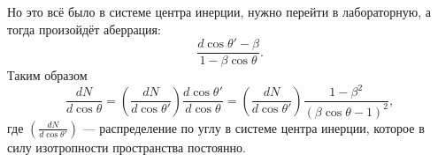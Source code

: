 Но это всё было в системе центра инерции, нужно перейти в лабораторную, а тогда произойдёт аберрация:
\begin{equation*}
	\frac{d \cos \theta' - \beta}{1 - \beta \cos \theta}.
\end{equation*}
Таким образом
\begin{equation*}
	\frac{d N}{d \cos \theta} = \left(\frac{d N}{d \cos \theta'}\right) \frac{d \cos \theta'}{d \cos \theta} 
	=
	\left(\frac{d N}{d \cos \theta'}\right) \frac{1 - \beta^2}{(\beta \cos \theta - 1)^2},
\end{equation*}
где $\left(\frac{d N}{d \cos \theta'}\right)$ --- распределение по углу в системе центра инерции, которое в силу изотропности пространства постоянно.